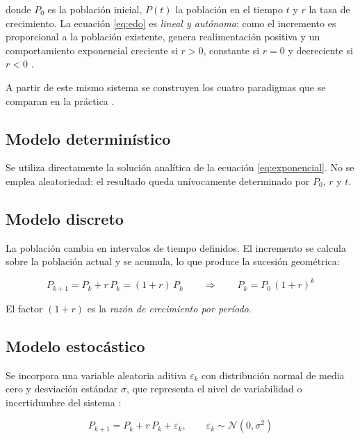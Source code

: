 \documentclass[11pt,a4paper]{article}
\begin{document}
donde $P_0$ es la poblaci\'on inicial, $P(t)$ la poblaci\'on en el tiempo $t$ y $r$ la tasa
de crecimiento. La ecuaci\'on \eqref{eq:edo} es \emph{lineal y aut\'onoma}: como el
incremento es proporcional a la poblaci\'on existente, genera realimentaci\'on positiva y
un comportamiento exponencial creciente si $r>0$, constante si $r=0$ y decreciente si
$r<0$ \cite{strogatz2015}.

A partir de este mismo sistema se construyen los cuatro paradigmas que se comparan en la
pr\'actica \cite{diaposSemana2}.

\subsection{Modelo determin\'istico}

Se utiliza directamente la soluci\'on anal\'itica de la ecuaci\'on \eqref{eq:exponencial}.
No se emplea aleatoriedad: el resultado queda un\'ivocamente determinado por $P_0$, $r$ y
$t$.

\subsection{Modelo discreto}

La poblaci\'on cambia en intervalos de tiempo definidos. El incremento se calcula sobre la
poblaci\'on actual y se acumula, lo que produce la sucesi\'on geom\'etrica:

\begin{equation}
P_{k+1} = P_k + r\,P_k = (1+r)\,P_k
\qquad\Longrightarrow\qquad
P_k = P_0\,(1+r)^{k}
\label{eq:discreto}
\end{equation}

El factor $(1+r)$ es la \emph{raz\'on de crecimiento por per\'iodo}.

\subsection{Modelo estoc\'astico}

Se incorpora una variable aleatoria aditiva $\varepsilon_k$ con distribuci\'on normal de
media cero y desviaci\'on est\'andar $\sigma$, que representa el nivel de variabilidad o
incertidumbre del sistema \cite{ross2014}:

\begin{equation}
P_{k+1} = P_k + r\,P_k + \varepsilon_k,
\qquad \varepsilon_k \sim \mathcal{N}\!\left(0,\sigma^{2}\right)
\label{eq:estocastico}
\end{equation}
\end{document}
